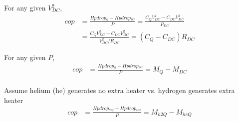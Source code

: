 \documentclass{article}
\begin{document}
For any given $V_{DC}^{2}$,
\begin{align}
cop & =\frac{Hpdrop_{^{Q}}-Hpdrop_{^{DC}}}{P}=\frac{C_{Q}V_{DC}^{2}%
-C_{DC}V_{DC}^{2}}{P_{DC}}\nonumber\\
& =\frac{C_{Q}V_{DC}^{2}-C_{DC}V_{DC}^{2}}{V_{DC}^{2}/R_{DC}}=\left(
C_{Q}-C_{DC}\right)  R_{DC}\label{5}
\end{align}

For any given $P$,
\begin{align}
cop & =\frac{Hpdrop_{^{Q}}-Hpdrop_{^{DC}}}{P}=M_{Q}-M_{DC}\label{6}
\end{align}\\

Assume helium (he) generates no extra heater vs. hydrogen generates extra heater 
\begin{align}
cop & =\frac{Hpdrop_{^{h2Q}}-Hpdrop_{^{heQ}}}{P}=M_{h2Q}-M_{heQ}\label{7}
\end{align}
\end{document}
